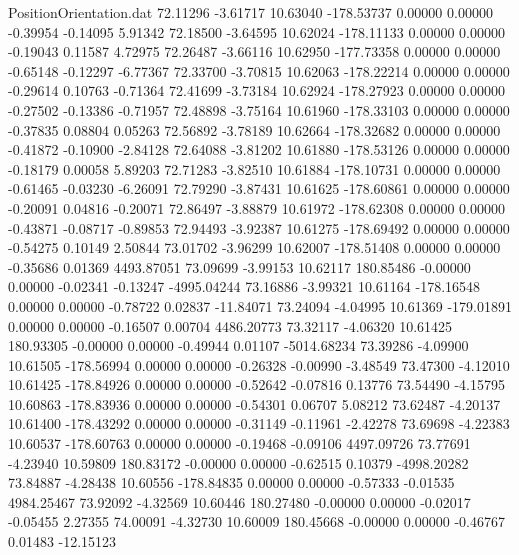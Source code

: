 \begin{filecontents}{PositionOrientation.dat}
  72.11296   -3.61717   10.63040  -178.53737    0.00000    0.00000   -0.39954   -0.14095    5.91342
  72.18500   -3.64595   10.62024  -178.11133    0.00000    0.00000   -0.19043    0.11587    4.72975
  72.26487   -3.66116   10.62950  -177.73358    0.00000    0.00000   -0.65148   -0.12297   -6.77367
  72.33700   -3.70815   10.62063  -178.22214    0.00000    0.00000   -0.29614    0.10763   -0.71364
  72.41699   -3.73184   10.62924  -178.27923    0.00000    0.00000   -0.27502   -0.13386   -0.71957
  72.48898   -3.75164   10.61960  -178.33103    0.00000    0.00000   -0.37835    0.08804    0.05263
  72.56892   -3.78189   10.62664  -178.32682    0.00000    0.00000   -0.41872   -0.10900   -2.84128
  72.64088   -3.81202   10.61880  -178.53126    0.00000    0.00000   -0.18179    0.00058    5.89203
  72.71283   -3.82510   10.61884  -178.10731    0.00000    0.00000   -0.61465   -0.03230   -6.26091
  72.79290   -3.87431   10.61625  -178.60861    0.00000    0.00000   -0.20091    0.04816   -0.20071
  72.86497   -3.88879   10.61972  -178.62308    0.00000    0.00000   -0.43871   -0.08717   -0.89853
  72.94493   -3.92387   10.61275  -178.69492    0.00000    0.00000   -0.54275    0.10149    2.50844
  73.01702   -3.96299   10.62007  -178.51408    0.00000    0.00000   -0.35686    0.01369 4493.87051
  73.09699   -3.99153   10.62117   180.85486   -0.00000    0.00000   -0.02341   -0.13247 -4995.04244
  73.16886   -3.99321   10.61164  -178.16548    0.00000    0.00000   -0.78722    0.02837  -11.84071
  73.24094   -4.04995   10.61369  -179.01891    0.00000    0.00000   -0.16507    0.00704 4486.20773
  73.32117   -4.06320   10.61425   180.93305   -0.00000    0.00000   -0.49944    0.01107 -5014.68234
  73.39286   -4.09900   10.61505  -178.56994    0.00000    0.00000   -0.26328   -0.00990   -3.48549
  73.47300   -4.12010   10.61425  -178.84926    0.00000    0.00000   -0.52642   -0.07816    0.13776
  73.54490   -4.15795   10.60863  -178.83936    0.00000    0.00000   -0.54301    0.06707    5.08212
  73.62487   -4.20137   10.61400  -178.43292    0.00000    0.00000   -0.31149   -0.11961   -2.42278
  73.69698   -4.22383   10.60537  -178.60763    0.00000    0.00000   -0.19468   -0.09106 4497.09726
  73.77691   -4.23940   10.59809   180.83172   -0.00000    0.00000   -0.62515    0.10379 -4998.20282
  73.84887   -4.28438   10.60556  -178.84835    0.00000    0.00000   -0.57333   -0.01535 4984.25467
  73.92092   -4.32569   10.60446   180.27480   -0.00000    0.00000   -0.02017   -0.05455    2.27355
  74.00091   -4.32730   10.60009   180.45668   -0.00000    0.00000   -0.46767    0.01483  -12.15123

\end{filecontents}
